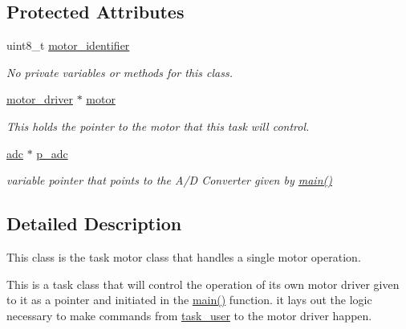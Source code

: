 \subsection*{Protected Attributes}
\begin{DoxyCompactItemize}
\item 
uint8\-\_\-t \hyperlink{classtask__motor_aeb4767ff390d9f8bd9f37dfcab0daa4b}{motor\-\_\-identifier}
\begin{DoxyCompactList}\small\item\em No private variables or methods for this class. \end{DoxyCompactList}\item 
\hypertarget{classtask__motor_aa2ed8c7d16f05cb57b11e86bdc7e646b}{\hyperlink{classmotor__driver}{motor\-\_\-driver} $\ast$ \hyperlink{classtask__motor_aa2ed8c7d16f05cb57b11e86bdc7e646b}{motor}}\label{classtask__motor_aa2ed8c7d16f05cb57b11e86bdc7e646b}

\begin{DoxyCompactList}\small\item\em This holds the pointer to the motor that this task will control. \end{DoxyCompactList}\item 
\hypertarget{classtask__motor_a388438912d463a7cb919dc6dbdcb2353}{\hyperlink{classadc}{adc} $\ast$ \hyperlink{classtask__motor_a388438912d463a7cb919dc6dbdcb2353}{p\-\_\-adc}}\label{classtask__motor_a388438912d463a7cb919dc6dbdcb2353}

\begin{DoxyCompactList}\small\item\em variable pointer that points to the A/\-D Converter given by \hyperlink{main_8cpp_a840291bc02cba5474a4cb46a9b9566fe}{main()} \end{DoxyCompactList}\end{DoxyCompactItemize}


\subsection{Detailed Description}
This class is the task motor class that handles a single motor operation. 

This is a task class that will control the operation of its own motor driver given to it as a pointer and initiated in the \hyperlink{main_8cpp_a840291bc02cba5474a4cb46a9b9566fe}{main()} function. it lays out the logic necessary to make commands from \hyperlink{classtask__user}{task\-\_\-user} to the motor driver happen. 

